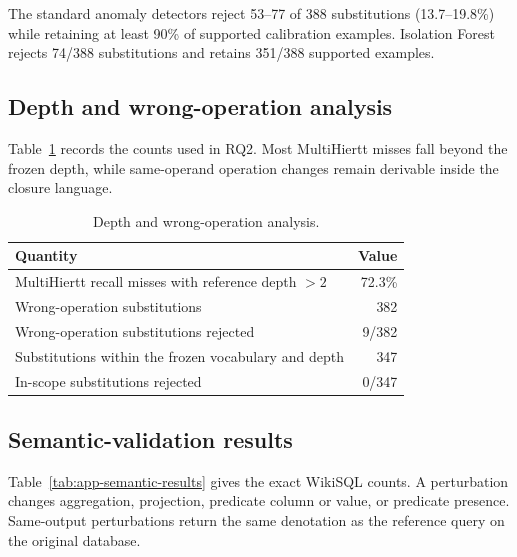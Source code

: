 The standard anomaly detectors reject 53--77 of 388 substitutions
(13.7--19.8\%) while retaining at least 90\% of supported calibration
examples. Isolation Forest rejects 74/388 substitutions and retains
351/388 supported examples.

\subsection{Depth and wrong-operation analysis}

Table~\ref{tab:app-depth-results} records the counts used in RQ2.
Most MultiHiertt misses fall beyond the frozen depth, while
same-operand operation changes remain derivable inside the closure
language.

\begin{table}[t]
\centering
\caption{Depth and wrong-operation analysis.}
\label{tab:app-depth-results}
\scriptsize
\setlength{\tabcolsep}{3pt}
\renewcommand{\arraystretch}{1.06}
\begin{tabularx}{\columnwidth}{@{}Xr@{}}
\toprule
Quantity & Value \\
\midrule
MultiHiertt recall misses with reference depth $>2$
& 72.3\% \\
Wrong-operation substitutions
& 382 \\
Wrong-operation substitutions rejected
& 9/382 \\
Substitutions within the frozen vocabulary and depth
& 347 \\
In-scope substitutions rejected
& 0/347 \\
\bottomrule
\end{tabularx}
\end{table}

\subsection{Semantic-validation results}

Table~\ref{tab:app-semantic-results} gives the exact WikiSQL
counts. A perturbation changes aggregation, projection, predicate
column or value, or predicate presence. Same-output perturbations
return the same denotation as the reference query on the original
database.

